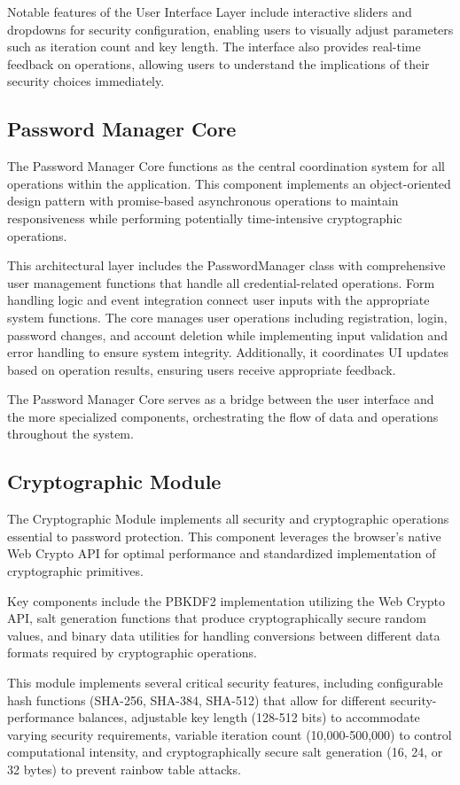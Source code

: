 \documentclass[11pt,a4paper]{article}
\begin{document}
Notable features of the User Interface Layer include interactive sliders and dropdowns for security configuration, enabling users to visually adjust parameters such as iteration count and key length. The interface also provides real-time feedback on operations, allowing users to understand the implications of their security choices immediately.
\subsection{Password Manager Core}
The Password Manager Core functions as the central coordination system for all operations within the application. This component implements an object-oriented design pattern with promise-based asynchronous operations to maintain responsiveness while performing potentially time-intensive cryptographic operations.

This architectural layer includes the PasswordManager class with comprehensive user management functions that handle all credential-related operations. Form handling logic and event integration connect user inputs with the appropriate system functions. The core manages user operations including registration, login, password changes, and account deletion while implementing input validation and error handling to ensure system integrity. Additionally, it coordinates UI updates based on operation results, ensuring users receive appropriate feedback.

The Password Manager Core serves as a bridge between the user interface and the more specialized components, orchestrating the flow of data and operations throughout the system.
\subsection{Cryptographic Module}
The Cryptographic Module implements all security and cryptographic operations essential to password protection. This component leverages the browser's native Web Crypto API for optimal performance and standardized implementation of cryptographic primitives.

Key components include the PBKDF2 implementation utilizing the Web Crypto API, salt generation functions that produce cryptographically secure random values, and binary data utilities for handling conversions between different data formats required by cryptographic operations.

This module implements several critical security features, including configurable hash functions (SHA-256, SHA-384, SHA-512) that allow for different security-performance balances, adjustable key length (128-512 bits) to accommodate varying security requirements, variable iteration count (10,000-500,000) to control computational intensity, and cryptographically secure salt generation (16, 24, or 32 bytes) to prevent rainbow table attacks.
\end{document}
